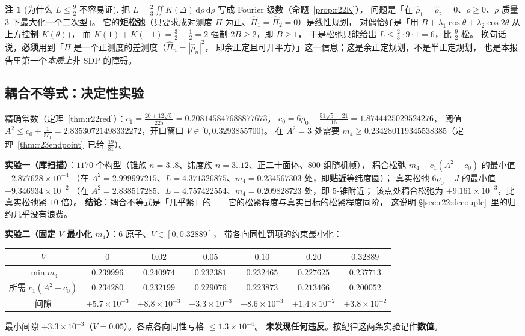 \documentclass[UTF8,11pt]{ctexart}
\theoremstyle{definition}
\newtheorem{remark}[theorem]{注}
\newcommand{\dd}{\,\mathrm{d}}
\begin{document}
\begin{remark}[为什么 $L\le\frac92$ 不容易证]\label{rem:r23Lsq}
把 $L=\frac23\iint K(\Delta)\dd\rho\dd\rho$ 写成 Fourier 级数（命题~\ref{prop:r22K}），
问题是「在 $\hat\rho_1=\hat\rho_2=0$、$\rho\ge0$、$\rho$ 质量 $3$ 下最大化一个二次型」。
它的\textbf{矩松弛}（只要求成对测度 $\Pi$ 为正、$\hat\Pi_1=\hat\Pi_2=0$）是线性规划，
对偶恰好是「用 $B+\lambda_1\cos\theta+\lambda_2\cos2\theta$ 从上方控制 $K(\theta)$」，
而 $K(1)+K(-1)=\frac32+\frac12=2$ 强制 $2B\ge2$，即 $B\ge1$，
于是松弛只能给出 $L\le\frac23\cdot9\cdot1=6$，比 $\frac92$ 松。
换句话说，\textbf{必须}用到「$\Pi$ 是一个正测度的差测度（$\hat\Pi_n=|\hat\rho_n|^2$，
即余正定且可开平方）」这一信息；这是余正定规划，不是半正定规划，
也是本报告里第一个\emph{本质上}非 SDP 的障碍。
\end{remark}

\subsection{耦合不等式：决定性实验}\label{sec:r23:coupled}

精确常数（定理~\ref{thm:r22red}）：$c_1=\frac{20+12\sqrt5}{225}=0.208145847688877673$，
$c_0=6\rho_0-\frac{51\sqrt5-21}{16}=1.8744425029524276$，
阈值 $A^2\le c_0+\frac1{5c_1}=2.83530721498332272$，开口窗口 $V\in[0,0.3293855700)$。
在 $A^2=3$ 处需要 $m_4\ge0.234280119345538385$（定理~\ref{thm:r23endpoint}~已给 $\frac{19}{81}$）。

\textbf{实验一（库扫描）}：$1170$ 个构型（锥族 $n=3..8$、纬度族 $n=3..12$、正二十面体、$800$ 组随机帧），
耦合松弛 $m_4-c_1(A^2-c_0)$ 的最小值 $+2.877628\times10^{-4}$
（在 $A^2=2.999997215$、$L=4.371326875$、$m_4=0.234567303$ 处，即\textbf{贴近}等纬度圆）；
真实松弛 $6\rho_0-J$ 的最小值 $+9.346934\times10^{-2}$
（在 $A^2=2.838517285$、$L=4.757422554$、$m_4=0.209828723$ 处，即 $5$-锥附近；
该点处耦合松弛为 $+9.161\times10^{-3}$，比真实松弛紧 $10$ 倍）。
\textbf{结论}：耦合不等式是「几乎紧」的——它的松紧程度与真实目标的松紧程度同阶，
这说明 \S\ref{sec:r22:decouple}~里的归约几乎没有浪费。

\textbf{实验二（固定 $V$ 最小化 $m_4$）}：$6$ 原子、$V\in[0,0.32889]$，
带各向同性罚项的约束最小化：
\begin{center}\small
\begin{tabular}{c|cccccc}
\toprule
$V$ & $0$ & $0.02$ & $0.05$ & $0.10$ & $0.20$ & $0.32889$\\
\midrule
$\min m_4$ & $0.239996$ & $0.240974$ & $0.232381$ & $0.232465$ & $0.227625$ & $0.237713$\\
所需 $c_1(A^2-c_0)$ & $0.234280$ & $0.232199$ & $0.229076$ & $0.223873$ & $0.213466$ & $0.200052$\\
间隙 & $+5.7\times10^{-3}$ & $+8.8\times10^{-3}$ & $+3.3\times10^{-3}$ & $+8.6\times10^{-3}$ & $+1.4\times10^{-2}$ & $+3.8\times10^{-2}$\\
\bottomrule
\end{tabular}
\end{center}
最小间隙 $+3.3\times10^{-3}$（$V=0.05$）。各点各向同性亏格 $\le1.3\times10^{-4}$。
\textbf{未发现任何违反}。按纪律这两条实验记作\textbf{数值}。
\end{document}
